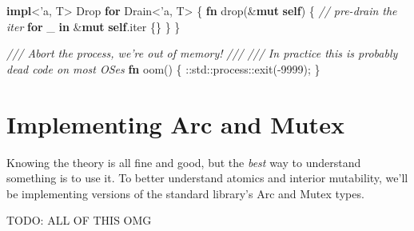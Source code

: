 \documentclass[a4paper,]{book}
\newenvironment{Shaded}{\begin{snugshade}}{\end{snugshade}}
\newcommand{\KeywordTok}[1]{\textcolor[rgb]{0.13,0.29,0.53}{\textbf{{#1}}}}
\newcommand{\DecValTok}[1]{\textcolor[rgb]{0.00,0.00,0.81}{{#1}}}
\newcommand{\CommentTok}[1]{\textcolor[rgb]{0.56,0.35,0.01}{\textit{{#1}}}}
\newcommand{\OtherTok}[1]{\textcolor[rgb]{0.56,0.35,0.01}{{#1}}}
\newcommand{\BuiltInTok}[1]{{#1}}
\newcommand{\NormalTok}[1]{{#1}}
\begin{document}
\begin{Shaded}
\begin{Highlighting}[]
\KeywordTok{impl}\NormalTok{<}\OtherTok{'a}\NormalTok{, T> }\BuiltInTok{Drop} \KeywordTok{for} \NormalTok{Drain<}\OtherTok{'a}\NormalTok{, T> \{}
    \KeywordTok{fn} \NormalTok{drop(&}\KeywordTok{mut} \KeywordTok{self}\NormalTok{) \{}
        \CommentTok{// pre-drain the iter}
        \KeywordTok{for} \NormalTok{_ }\KeywordTok{in} \NormalTok{&}\KeywordTok{mut} \KeywordTok{self}\NormalTok{.iter \{\}}
    \NormalTok{\}}
\NormalTok{\}}

\CommentTok{/// Abort the process, we're out of memory!}
\CommentTok{///}
\CommentTok{/// In practice this is probably dead code on most OSes}
\KeywordTok{fn} \NormalTok{oom() \{}
    \NormalTok{::std::process::exit(-}\DecValTok{9999}\NormalTok{);}
\NormalTok{\}}
\end{Highlighting}
\end{Shaded}

\chapter{Implementing Arc and Mutex}\label{sec--arc-and-mutex}

Knowing the theory is all fine and good, but the \emph{best} way to
understand something is to use it. To better understand atomics and
interior mutability, we'll be implementing versions of the standard
library's Arc and Mutex types.

TODO: ALL OF THIS OMG
\end{document}
